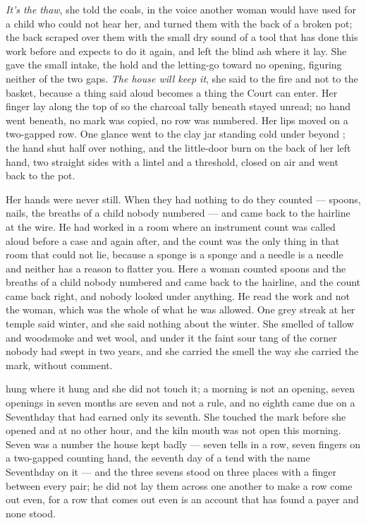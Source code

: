 \emph{It's the thaw}, she told the coals, in the voice another woman would have used for a child who could not hear her, and turned them with the back of a broken pot; the back scraped over them with the small dry sound of a tool that has done this work before and expects to do it again, and left the blind ash where it lay. She gave the small intake, the hold and the letting-go toward no opening, figuring neither of the two gaps. \emph{The house will keep it}, she said to the fire and not to the basket, because a thing said aloud becomes a thing the Court can enter. Her finger lay along the top of  so the charcoal tally beneath stayed unread; no hand went beneath, no mark was copied, no row was numbered. Her lips moved on a two-gapped row. One glance went to the clay jar standing cold under  beyond ; the hand shut half over nothing, and the little-door burn on the back of her left hand, two straight sides with a lintel and a threshold, closed on air and went back to the pot.

Her hands were never still. When they had nothing to do they counted --- spoons, nails, the breaths of a child nobody numbered --- and came back to the hairline at the wire. He had worked in a room where an instrument count was called aloud before a case and again after, and the count was the only thing in that room that could not lie, because a sponge is a sponge and a needle is a needle and neither has a reason to flatter you. Here a woman counted spoons and the breaths of a child nobody numbered and came back to the hairline, and the count came back right, and nobody looked under anything. He read the work and not the woman, which was the whole of what he was allowed. One grey streak at her temple said winter, and she said nothing about the winter. She smelled of tallow and woodsmoke and wet wool, and under it the faint sour tang of the corner nobody had swept in two years, and she carried the smell the way she carried the mark, without comment.

 hung where it hung and she did not touch it; a morning is not an opening, seven openings in seven months are seven and not a rule, and no eighth came due on a Seventhday that had earned only its seventh. She touched the mark before she opened  and at no other hour, and the kiln mouth was not open this morning. Seven was a number the house kept badly --- seven tells in a row, seven fingers on a two-gapped counting hand, the seventh day of a tend with the name Seventhday on it --- and the three sevens stood on three places with a finger between every pair; he did not lay them across one another to make a row come out even, for a row that comes out even is an account that has found a payer and none stood.

